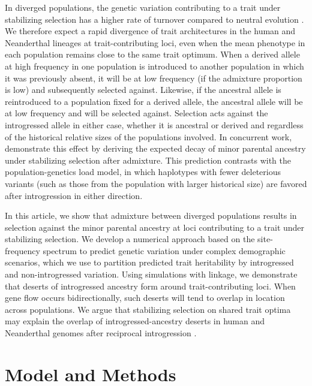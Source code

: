 \documentclass{article}
\begin{document}
In diverged populations, the genetic variation contributing to a trait under
stabilizing selection has a higher rate of turnover compared to neutral
evolution \citep{yair2022population}. We therefore expect a rapid divergence of
trait architectures in the human and Neanderthal lineages at trait-contributing
loci, even when the mean phenotype in each population remains close to the same
trait optimum. When a derived allele at high frequency in one population is
introduced to another population in which it was previously absent, it will be
at low frequency (if the admixture proportion is low) and subsequently selected
against. Likewise, if the ancestral allele is reintroduced to a population
fixed for a derived allele, the ancestral allele will be at low frequency and
will be selected against. Selection acts against the introgressed allele in
either case, whether it is ancestral or derived and regardless of the
historical relative sizes of the populations involved. In concurrent work,
\citet{veller2024stabilizing} demonstrate this effect by deriving the expected
decay of minor parental ancestry under stabilizing selection after admixture.
This prediction contrasts with the population-genetics load model, in which
haplotypes with fewer deleterious variants (such as those from the population
with larger historical size) are favored after introgression in either
direction.

In this article, we show that admixture between diverged populations results in
selection against the minor parental ancestry at loci contributing to a trait
under stabilizing selection. We develop a numerical approach based on the
site-frequency spectrum to predict genetic variation under complex demographic
scenarios, which we use to partition predicted trait heritability by
introgressed and non-introgressed variation. Using simulations with linkage, we
demonstrate that deserts of introgressed ancestry form around
trait-contributing loci. When gene flow occurs bidirectionally, such deserts
will tend to overlap in location across populations. We argue that stabilizing
selection on shared trait optima may explain the overlap of
introgressed-ancestry deserts in human and Neanderthal genomes after reciprocal
introgression \citep{harris2023diverse}.

\section*{Model and Methods}
\end{document}
